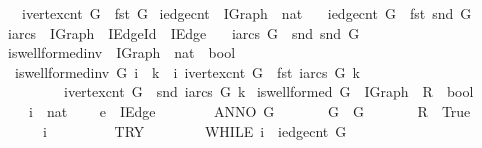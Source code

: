 \begin{isabellebody}
\ \ \ {\isachardoublequoteopen}ivertex{\isacharunderscore}cnt\ G\ {\isasymequiv}\ fst\ G{\isachardoublequoteclose}\isanewline
\isanewline
{}\isamarkupfalse%
\ iedge{\isacharunderscore}cnt\ {\isacharcolon}{\isacharcolon}\ {\isachardoublequoteopen}IGraph\ {\isasymRightarrow}\ nat{\isachardoublequoteclose}\isanewline
\ \ \ {\isachardoublequoteopen}iedge{\isacharunderscore}cnt\ G\ {\isasymequiv}\ fst\ {\isacharparenleft}snd\ G{\isacharparenright}{\isachardoublequoteclose}\isanewline
\isanewline
{}\isamarkupfalse%
\ iarcs\ {\isacharcolon}{\isacharcolon}\ {\isachardoublequoteopen}IGraph\ {\isasymRightarrow}\ IEdge{\isacharunderscore}Id\ {\isasymRightarrow}\ IEdge{\isachardoublequoteclose}\isanewline
\ \ \ {\isachardoublequoteopen}iarcs\ G\ {\isasymequiv}\ snd\ {\isacharparenleft}snd\ G{\isacharparenright}{\isachardoublequoteclose}\isanewline
\isanewline
{}\isamarkupfalse%
\ is{\isacharunderscore}wellformed{\isacharunderscore}inv\ {\isacharcolon}{\isacharcolon}\ {\isachardoublequoteopen}IGraph\ {\isasymRightarrow}\ nat\ {\isasymRightarrow}\ bool{\isachardoublequoteclose}\ \isanewline
\ \ {\isachardoublequoteopen}is{\isacharunderscore}wellformed{\isacharunderscore}inv\ G\ i\ {\isasymequiv}\ {\isasymforall}k\ {\isacharless}\ i{\isachardot}\ ivertex{\isacharunderscore}cnt\ G\ {\isachargreater}\ fst\ {\isacharparenleft}iarcs\ G\ k{\isacharparenright}\isanewline
\ \ \ \ \ \ \ \ {\isasymand}\ ivertex{\isacharunderscore}cnt\ G\ {\isachargreater}\ snd\ {\isacharparenleft}iarcs\ G\ k{\isacharparenright}{\isachardoublequoteclose}\isanewline
\isanewline
{}\isamarkupfalse%
\ is{\isacharunderscore}wellformed\ {\isacharparenleft}G\ {\isacharcolon}{\isacharcolon}\ IGraph\ {\isacharbar}\ R\ {\isacharcolon}{\isacharcolon}\ bool{\isacharparenright}\isanewline
\ \ \isanewline
\ \ \ \ i\ {\isacharcolon}{\isacharcolon}\ nat\isanewline
\ \ \ \ e\ {\isacharcolon}{\isacharcolon}\ IEdge\isanewline
\ \ \ {\isachardoublequoteopen}\isanewline
\ \ \ \ ANNO\ G{\isachardot}\isanewline
\ \ \ \ \ \ {\isasymlbrace}\ {\isasymacute}G\ {\isacharequal}\ G\ {\isasymrbrace}\isanewline
\ \ \ \ \ \ {\isasymacute}R\ {\isacharcolon}{\isacharequal}{\isacharequal}\ True\ {\isacharsemicolon}{\isacharsemicolon}\isanewline
\ \ \ \ \ \ {\isasymacute}i\ {\isacharcolon}{\isacharequal}{\isacharequal}\ {}\ {\isacharsemicolon}{\isacharsemicolon}\isanewline
\ \ \ \ \ \ TRY\isanewline
\ \ \ \ \ \ \ \ WHILE\ {\isasymacute}i\ {\isacharless}\ iedge{\isacharunderscore}cnt\ {\isasymacute}G\isanewline

\end{isabellebody}

